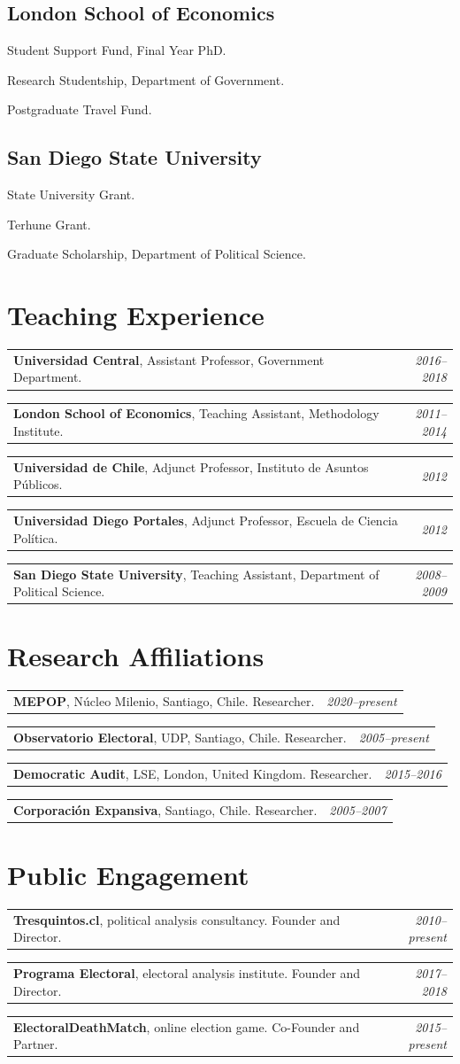 \documentclass[11pt,letterpaper]{article}
\makeatletter
\newif\ifafterhead
\newlength{\entrygap}\setlength{\entrygap}{8.5pt}
\newcommand{\gap}{\ifafterhead\global\afterheadfalse\else\vspace{\entrygap}\fi}
\newcommand{\entry}[1]{\par\gap\hangindent=13pt\hangafter=1\noindent #1\par}
\newcommand{\dated}[2]{\par\gap\noindent\begin{tabularx}{\linewidth}{@{}X@{\hspace{6pt}}r@{}}#1 & \textit{#2}\end{tabularx}\par}
\makeatother
\begin{document}
\subsection{London School of Economics}
\entry{Student Support Fund, Final Year PhD.}
\entry{Research Studentship, Department of Government.}
\entry{Postgraduate Travel Fund.}

\subsection{San Diego State University}
\entry{State University Grant.}
\entry{Terhune Grant.}
\entry{Graduate Scholarship, Department of Political Science.}

\section{Teaching Experience}
\dated{\textbf{Universidad Central}, Assistant Professor, Government Department.}{2016--2018}
\dated{\textbf{London School of Economics}, Teaching Assistant, Methodology Institute.}{2011--2014}
\dated{\textbf{Universidad de Chile}, Adjunct Professor, Instituto de Asuntos Públicos.}{2012}
\dated{\textbf{Universidad Diego Portales}, Adjunct Professor, Escuela de Ciencia Política.}{2012}
\dated{\textbf{San Diego State University}, Teaching Assistant, Department of Political Science.}{2008--2009}

\section{Research Affiliations}
\dated{\textbf{MEPOP}, Núcleo Milenio, Santiago, Chile. Researcher.}{2020--present}
\dated{\textbf{Observatorio Electoral}, UDP, Santiago, Chile. Researcher.}{2005--present}
\dated{\textbf{Democratic Audit}, LSE, London, United Kingdom. Researcher.}{2015--2016}
\dated{\textbf{Corporación Expansiva}, Santiago, Chile. Researcher.}{2005--2007}

\section{Public Engagement}
\dated{\textbf{Tresquintos.cl}, political analysis consultancy. Founder and Director.}{2010--present}
\dated{\textbf{Programa Electoral}, electoral analysis institute. Founder and Director.}{2017--2018}
\dated{\textbf{ElectoralDeathMatch}, online election game. Co-Founder and Partner.}{2015--present}
\end{document}
